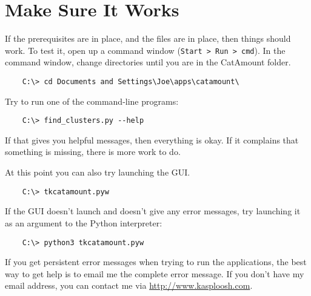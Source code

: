 \section{Make Sure It Works}

If the prerequisites are in place, and the files are in place, then things
should work. To test it, open up a command window (\texttt{Start > Run > cmd}).
In the command window, change directories until you are in the CatAmount
folder.

\begin{verbatim}
    C:\> cd Documents and Settings\Joe\apps\catamount\
\end{verbatim}

Try to run one of the command-line programs:

\begin{verbatim}
    C:\> find_clusters.py --help
\end{verbatim}

If that gives you helpful messages, then everything is okay. If it complains
that something is missing, there is more work to do.

At this point you can also try launching the GUI.

\begin{verbatim}
    C:\> tkcatamount.pyw
\end{verbatim}

If the GUI doesn't launch and doesn't give any error messages, try launching
it as an argument to the Python interpreter:

\begin{verbatim}
    C:\> python3 tkcatamount.pyw
\end{verbatim}

If you get persistent error messages when trying to run the applications, the
best way to get help is to email me the complete error message. If you don't
have my email address, you can contact me via \url{http://www.kasploosh.com}.

